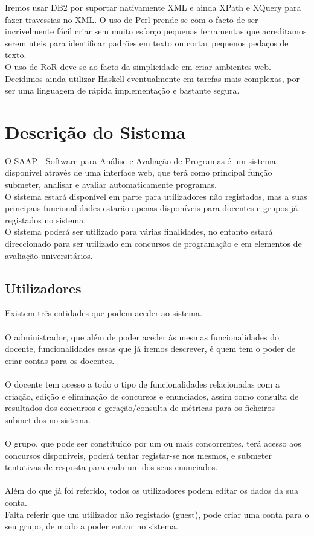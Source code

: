 Iremos usar DB2 por suportar nativamente XML e ainda XPath e XQuery para fazer travessias no XML. O uso de Perl prende-se com o facto de ser incrivelmente fácil criar
sem muito esforço pequenas ferramentas que acreditamos serem uteis para identificar padrões em texto ou cortar pequenos pedaços de texto.\\
O uso de RoR deve-se ao facto da simplicidade em criar ambientes web. Decidimos ainda utilizar Haskell eventualmente em tarefas mais complexas, por ser uma linguagem de rápida
implementação e bastante segura.


\section{Descrição do Sistema}
O SAAP - Software para Análise e Avaliação de Programas é um sistema disponível através de uma interface web, que terá como principal função 
submeter, analisar e avaliar automaticamente programas.\\
O sistema estará disponível em parte para utilizadores não registados, mas a suas principais funcionalidades estarão apenas disponíveis para docentes 
e grupos já registados no sistema.\\
O sistema poderá ser utilizado para várias finalidades, no entanto estará direccionado para ser utilizado em concursos de programação e em elementos 
de avaliação universitários.

\subsection{Utilizadores}
Existem três entidades que podem aceder ao sistema.\\ \\
O administrador, que além de poder aceder às mesmas funcionalidades do docente, funcionalidades essas que já iremos descrever, é quem tem o poder de
criar contas para os docentes.\\
\\
O docente tem acesso a todo o tipo de funcionalidades relacionadas com a criação, edição e eliminação de concursos e enunciados, assim como consulta
de resultados dos concursos e geração/consulta de métricas para os ficheiros submetidos no sistema.\\
\\
O grupo, que pode ser constituído por um ou mais concorrentes, terá acesso aos concursos disponíveis, poderá tentar registar-se nos mesmos, e submeter
tentativas de resposta para cada um dos seus enunciados.\\
\\
Além do que já foi referido, todos os utilizadores podem editar os dados da sua conta.\\ 
Falta referir que um utilizador não registado (guest), pode criar uma conta para o seu grupo, de modo a poder entrar no sistema.

